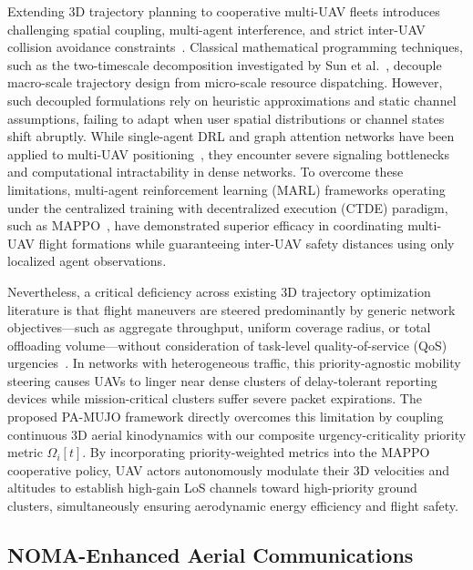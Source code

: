 \documentclass[journal]{IEEEtran}
\begin{document}
Extending 3D trajectory planning to cooperative multi-UAV fleets introduces challenging spatial coupling, multi-agent interference, and strict inter-UAV collision avoidance constraints~\cite{11440830, kang2023cooperative}. Classical mathematical programming techniques, such as the two-timescale decomposition investigated by Sun et al.~\cite{TJCCT}, decouple macro-scale trajectory design from micro-scale resource dispatching. However, such decoupled formulations rely on heuristic approximations and static channel assumptions, failing to adapt when user spatial distributions or channel states shift abruptly. While single-agent DRL and graph attention networks have been applied to multi-UAV positioning~\cite{zhan2026joint}, they encounter severe signaling bottlenecks and computational intractability in dense networks. To overcome these limitations, multi-agent reinforcement learning (MARL) frameworks operating under the centralized training with decentralized execution (CTDE) paradigm, such as MAPPO~\cite{kang2023cooperative, yu2022mappo}, have demonstrated superior efficacy in coordinating multi-UAV flight formations while guaranteeing inter-UAV safety distances using only localized agent observations.

Nevertheless, a critical deficiency across existing 3D trajectory optimization literature is that flight maneuvers are steered predominantly by generic network objectives---such as aggregate throughput, uniform coverage radius, or total offloading volume---without consideration of task-level quality-of-service (QoS) urgencies~\cite{li2026tnse, zhan2026joint, kang2023cooperative}. In networks with heterogeneous traffic, this priority-agnostic mobility steering causes UAVs to linger near dense clusters of delay-tolerant reporting devices while mission-critical clusters suffer severe packet expirations. The proposed PA-MUJO framework directly overcomes this limitation by coupling continuous 3D aerial kinodynamics with our composite urgency-criticality priority metric $\Omega_i[t]$. By incorporating priority-weighted metrics into the MAPPO cooperative policy, UAV actors autonomously modulate their 3D velocities and altitudes to establish high-gain LoS channels toward high-priority ground clusters, simultaneously ensuring aerodynamic energy efficiency and flight safety.

\subsection{NOMA-Enhanced Aerial Communications}
\end{document}
